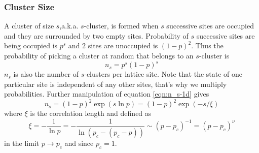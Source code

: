 		\subsubsection{Cluster Size}
		A cluster of size $s$,a.k.a. $s$-cluster, is formed when $s$ successive sites are occupied and they are surrounded by two empty sites. Probability of $s$ successive sites are being occupied is $p^s$ and $2$ sites are unoccupied is $(1-p)^2$. Thus the probability of picking a cluster at random that belongs to an $s$-cluster is
		\begin{equation}
			n_s = p^s (1-p)^s
			\label{eqn:n_s-1d}
		\end{equation}
		$n_s$ is also the number of $s$-clusters per lattice site. Note that the state of one particular site is independent of any other sites, that's why we multiply probabilities. Further manipulation of equation \ref{eqn:n_s-1d} gives
		\begin{equation}
			n_s = (1-p)^2 \exp (s \ln p) = (1-p)^2 \exp(-s/\xi)
		\end{equation}
		where $\xi$ is the correlation length and defined as
		\begin{equation}
			\xi = -\frac{1}{\ln p} = - \frac{1}{\ln(p_c - (p_c -p))} \sim (p-p_c)^{-1} = (p-p_c)^\nu
			\label{eqn:correlation-length-def}
		\end{equation}
		in the limit $p\rightarrow p_c$ and since $p_c=1$.
